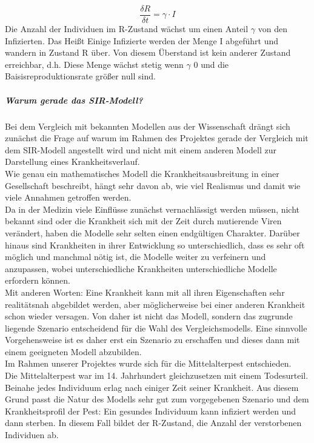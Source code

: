 \begin{equation}
\frac{\delta R }{\delta t} = \gamma \cdot I
\end{equation}
Die Anzahl der Individuen im R-Zustand wächst um einen Anteil $\gamma$ von den Infizierten. Das Heißt Einige Infizierte werden der Menge I abgeführt und wandern in Zustand R über. Von diesem Überstand ist kein anderer Zustand erreichbar, d.h. Diese Menge wächst stetig wenn $\gamma$ 0 und die Baisisreproduktionsrate größer null sind.
\subparagraph{Warum gerade das SIR-Modell?}
Bei dem Vergleich mit bekannten Modellen aus der Wissenschaft drängt sich zunächst die Frage auf warum im Rahmen des Projektes gerade der Vergleich mit dem SIR-Modell angestellt wird und nicht mit einem anderen Modell zur Darstellung eines Krankheitsverlauf.\\
Wie genau ein mathematisches Modell die Krankheitsausbreitung in einer Gesellschaft beschreibt, hängt sehr davon ab, wie viel Realismus und damit wie viele Annahmen getroffen werden.\\
Da in der Medizin viele Einflüsse zunächst vernachlässigt werden müssen, nicht bekannt sind oder die Krankheit sich mit der Zeit durch mutierende Viren verändert, haben die Modelle sehr selten einen endgültigen Charakter. Darüber hinaus sind Krankheiten in ihrer Entwicklung so unterschiedlich, dass es sehr oft möglich und manchmal nötig ist, die Modelle weiter zu verfeinern und anzupassen, wobei unterschiedliche Krankheiten unterschiedliche Modelle erfordern können. 
\cite{sebM}\\
Mit anderen Worten: Eine Krankheit kann mit all ihren Eigenschaften sehr realitätsnah abgebildet werden, aber möglicherweise bei einer anderen Krankheit schon wieder versagen. Von daher ist nicht das Modell, sondern das zugrunde liegende Szenario entscheidend für die Wahl des Vergleichsmodells. Eine sinnvolle Vorgehensweise ist es daher erst ein Szenario zu erschaffen und dieses dann mit einem geeigneten Modell abzubilden.\\ 
Im Rahmen unserer Projektes wurde sich für die Mittelalterpest entschieden.\\ 
Die Mittelalterpest war im 14. Jahrhundert gleichzusetzen mit einem Todesurteil. Beinahe jedes Individuum erlag nach einiger Zeit seiner Krankheit. Aus diesem Grund passt die Natur des Modells sehr gut zum vorgegebenen Szenario und dem Krankheitsprofil der Pest: Ein gesundes Individuum kann infiziert werden und dann sterben. In diesem Fall bildet der \glqq R\grqq-Zustand, die Anzahl der verstorbenen Individuen ab.\\
